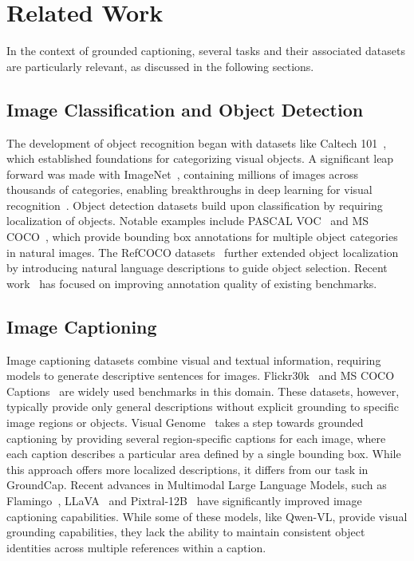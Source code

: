 \section{Related Work}
\label{sec:related-work}
    In the context of grounded captioning, several tasks and their associated datasets are particularly relevant, as discussed in
    the following sections.

    \subsection{Image Classification and Object Detection}\label{subsec:image-classification-and-object-detection}
    The development of object recognition began with datasets like Caltech 101~\cite{fei2004learning},
    which established foundations for categorizing visual objects.
    A significant leap forward was made with ImageNet~\cite{deng2009imagenet}, containing millions of images across thousands of categories, enabling breakthroughs in deep learning for visual recognition~\cite{krizhevsky2012imagenet}.
    Object detection datasets build upon classification by requiring localization of objects.
    Notable examples include PASCAL VOC~\cite{everingham2010pascal} and MS COCO~\cite{lin2014microsoft}, which provide bounding
    box annotations for multiple object categories in natural images.
    The RefCOCO datasets~\cite{refitgame2014, yu2016modeling} further extended object localization
    by introducing natural language descriptions to guide object selection.
    Recent work~\cite{tong2023rethinking} has focused on improving annotation quality of existing benchmarks.

    \subsection{Image Captioning}\label{subsec:image-captioning}
    Image captioning datasets combine visual and textual information, requiring models to generate descriptive sentences for images.
    Flickr30k~\cite{young2014image} and MS COCO Captions~\cite{lin2014microsoft} are widely used benchmarks in this domain.
    These datasets, however, typically provide only general descriptions without explicit grounding to specific image regions or objects.
    Visual Genome~\cite{krishna2017visual} takes a step towards grounded captioning by providing several region-specific
    captions for each image, where each caption describes a particular area defined by a single bounding box.
    While this approach offers more localized descriptions, it differs from our task in GroundCap.
    Recent advances in Multimodal Large Language Models, such as Flamingo~\cite{alayrac2022flamingo},
    LLaVA~\cite{liu2023visual} and Pixtral-12B~\cite{pixtral12B} have significantly improved image captioning capabilities.
    While some of these models, like Qwen-VL, provide visual grounding capabilities, they lack the ability to maintain
    consistent object identities across multiple references within a caption.

